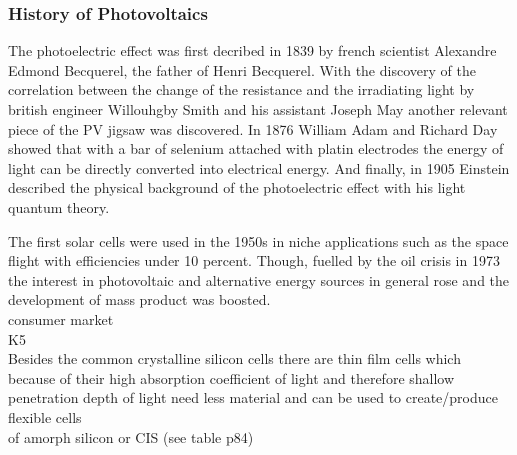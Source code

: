 \subsubsection{History of Photovoltaics}
The photoelectric effect was first decribed in 1839 by french scientist Alexandre Edmond Becquerel\cite{becquerel1839memoire}, the father of Henri Becquerel. 
With the discovery of the correlation between the {change of the }resistance and the irradiating light by british engineer Willouhgby Smith and his assistant Joseph May another relevant piece of the PV jigsaw was discovered. 
In 1876 William Adam and Richard Day showed that with a bar of selenium attached with platin electrodes the energy of light can be directly converted into electrical energy.
And finally, in 1905 Einstein described the physical background of the photoelectric effect with his light quantum theory\cite{einstein1905erzeugung}.

The first solar cells were used in the 1950s in niche applications such as the space flight with efficiencies under 10 percent. 
Though, fuelled by the oil crisis in 1973 the interest in photovoltaic and alternative energy sources in general rose and the development of mass product was boosted. \\
consumer market
\\
K5\\
Besides the common crystalline silicon cells there are thin film cells which because of their high absorption coefficient of light and therefore shallow penetration depth of light
need less material and can be used to create/produce flexible cells \\
of amorph silicon or CIS (see table p84) 

